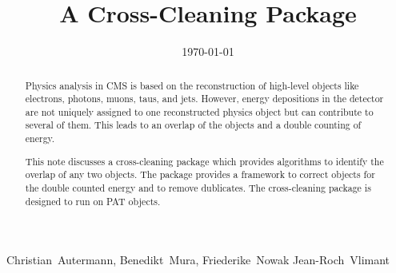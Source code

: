 \documentclass{cmspaper}
\begin{document}

\begin{titlepage}

\date{\today}

\title{A Cross-Cleaning Package}

\begin{Authlist}
    Christian~Autermann, Benedikt~Mura, Friederike~Nowak
    Jean-Roch~Vlimant
\end{Authlist}




\begin{abstract}
Physics analysis in CMS is based on the reconstruction of high-level objects
like electrons, photons, muons, taus, and jets. However, energy depositions in
the detector are not uniquely assigned to one reconstructed physics object but
can contribute to several of them. This leads to an overlap of the objects and
a double counting of energy.

This note discusses a cross-cleaning package which provides algorithms to
identify the overlap of any two objects. The package provides a framework to
correct objects for the double counted energy and to remove dublicates. The
cross-cleaning package is designed to run on {\sc PAT} objects.
\end{abstract} 


\end{titlepage}

\end{document}
